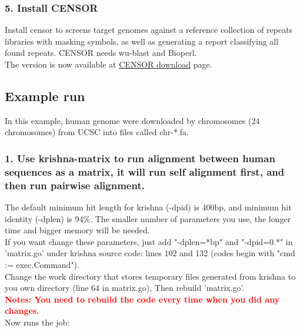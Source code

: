 \documentclass[12pt]{report}
\begin{document}
\subsubsection{5. Install CENSOR}
Install censor to screens target genomes against a reference collection of repeats libraries with masking symbols, as well as generating a report classifying all found repeats. CENSOR needs wu-blast and Bioperl.\\

The version is now available at \href{http://www.girinst.org/downloads/software/censor/} {\color{blue}CENSOR download} page.



\subsection*{Example run}
In this example, human genome were downloaded by chromosomes (24 chromosomes) from UCSC into files called chr-*.fa.\\

\subsubsection{1. Use krishna-matrix to run alignment between human sequences as a matrix, it will run self alignment first, and then run pairwise alignment.}

The default minimum hit length for krishna (-dpid) is 400bp, and minimum hit identity (-dplen) is 94\%. The smaller number of parameters you use, the longer time and bigger memory will be needed. \\

If you want change these parameters, just add "-dplen=*bp" and "-dpid=0.*" in 'matrix.go' under krishna source code: lines 102 and 132 (codes begin with "cmd := exec.Command").\\

Change the work directory that stores temporary files generated from krishna to you own directory (line 64 in matrix.go), Then rebuild 'matrix.go'. \\

\textbf{\textcolor{red}{Notes: You need to rebuild the code every time when you did any changes. }} \\

Now runs the job:
\end{document}
